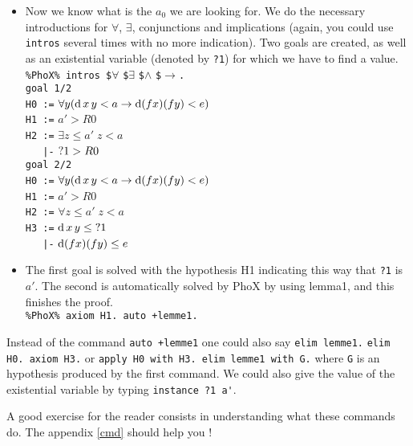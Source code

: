 \begin{itemize}
\item Now we know what is the  $a_0$ we are looking for. We do the necessary
introductions for $\forall$, $\exists$, conjunctions and implications (again,
you could use \verb~intros~ several times with no more indication). Two
goals are created, as well as an existential variable (denoted by
\verb~?1~)  for which we have to find a value.\\

\verb~%PhoX% intros $~$\forall$ \verb~$~$\exists$ \verb~$~$\land$ \verb~$~$\to$\verb~.~\\
\verb~goal 1/2~\\
\verb~H0 :=~ $\forall y (\hbox{d}\,x\,y < a \to \hbox{d} (f x) (f y) < e)$\\
\verb~H1 :=~ $a' > R0$\\
\verb~H2 :=~ $\exists z{\leq}a' \; z < a$\\
\verb~   |-~ $\hbox{?1} > R0$ \\
\verb~goal 2/2~\\
\verb~H0 :=~ $\forall y (\hbox{d}\,x\,y < a \to \hbox{d} (f x) (f y) < e)$\\
\verb~H1 :=~ $a' > R0$\\
\verb~H2 :=~ $\forall z{\leq}a' \; z < a$\\
\verb~H3 :=~ $\hbox{d}\,x\,y \leq \hbox{?1}$\\
\verb~   |-~ $\hbox{d} (f x) (f y) \leq e$

\item The first goal is solved with the hypothesis  H1 indicating this way that
\verb~?1~ is $a'$. The second is automatically solved by  PhoX
by using lemma1, and this finishes the proof.\\
\verb~%PhoX% axiom H1. auto +lemme1.~
\end{itemize}

 Instead of the command \verb~auto +lemme1~ one could
also say \verb~elim lemme1.~ \verb~elim H0. axiom H3.~ or
\verb~apply H0 with H3. elim lemme1 with G.~ where \verb~G~ is an
hypothesis produced by the first command. We could also give the value
of the existential variable by typing \verb~instance ?1 a'~.

\noindent A good exercise for the reader consists in understanding what these
                             commands do. The appendix \ref{cmd} should help you !

